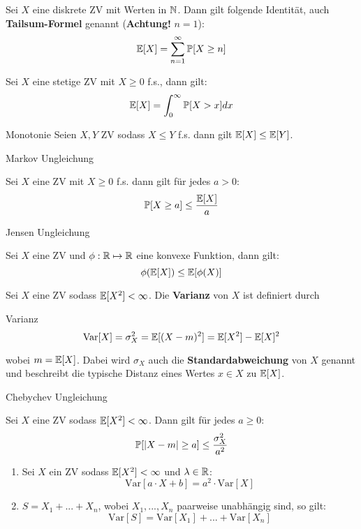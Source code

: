 
Sei $X$ eine diskrete ZV mit Werten in $\mathbb{N}$. Dann gilt folgende Identität, auch \textbf{Tailsum-Formel} genannt (\textbf{Achtung!} $n=1$):
$$\mathbb{E}[X] = \sum_{n=1}^\infty \mathbb{P}[X \geq n]$$

Sei $X$ eine stetige ZV mit $X \geq 0$ f.s., dann gilt:
$$\mathbb{E}[X] = \int_0^\infty \mathbb{P}[X > x] dx$$



\begin{mainbox}{Monotonie} Seien $X,Y$ ZV sodass $X \leq Y$ f.s. dann gilt $\mathbb{E}[X] \leq \mathbb{E}[Y]$. \end{mainbox}

\begin{mainbox}
    {Markov Ungleichung} 
    
    Sei $X$ eine ZV mit $X \geq 0$ f.s. dann gilt für jedes $a > 0$:
    $$\mathbb{P}[X \geq a] \leq \frac{\mathbb{E}[X]}{a}$$
\end{mainbox}

\begin{mainbox}
    {Jensen Ungleichung} 
    
    Sei $X$ eine ZV und $\phi: \mathbb{R} \mapsto \mathbb{R}$ eine konvexe Funktion, dann gilt:
    $$\phi(\mathbb{E}[X]) \leq \mathbb{E}[\phi(X)]$$
\end{mainbox}



Sei $X$ eine ZV sodass $\mathbb{E}[X^2] < \infty$. Die \textbf{Varianz} von $X$ ist definiert durch 
\begin{mainbox}{Varianz}
   $$\text{Var}[X] = \sigma_X^2 = \mathbb{E}[(X-m)^2] = \mathbb{E}[X^2] - \mathbb{E}[X]^2$$ 
\end{mainbox}

wobei $m = \mathbb{E}[X]$. Dabei wird $\sigma_X$ auch die \textbf{Standardabweichung} von $X$ genannt und beschreibt die typische Distanz eines Wertes $x \in X$ zu $\mathbb{E}[X]$. \medskip

\begin{mainbox}
    {Chebychev Ungleichung}
    
    Sei $X$ eine ZV sodass $\mathbb{E}[X^2] < \infty$. Dann gilt für jedes $a \geq 0$:
    $$\mathbb{P}[|X - m| \geq a] \leq \frac{\sigma_X^2}{a^2}$$
\end{mainbox}

\begin{subbox}{}
    \begin{enumerate}
        \item Sei $X$ ein ZV sodass $\mathbb{E}[X^2] < \infty$ und $\lambda \in \mathbb{R}$: 
        $$\text{Var}[a \cdot X + b] = a^2 \cdot \text{Var}[X]$$
        \item $S = X_1 + ... + X_n$, wobei $X_1,...,X_n$ paarweise unabhängig sind, so gilt:
        $$\text{Var}[S] = \text{Var}[X_1] + ... + \text{Var}[X_n]$$
    \end{enumerate}
\end{subbox}


